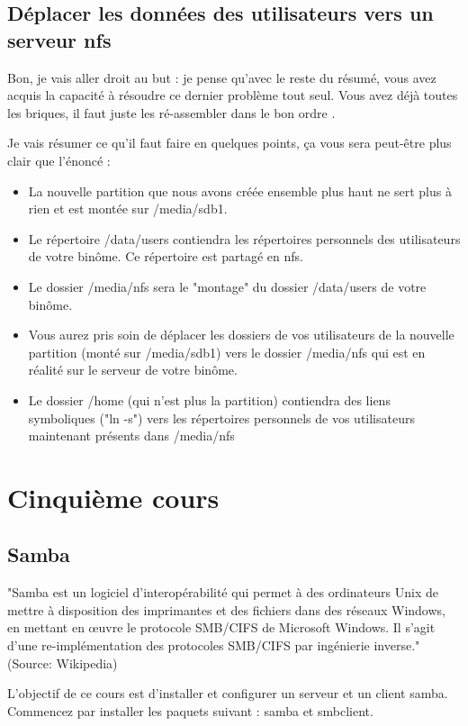 \documentclass[a4paper,11pt]{article}
\begin{document}
\subsection{Déplacer les données des utilisateurs vers un serveur nfs}
\par Bon, je vais aller droit au but : je pense qu'avec le reste du résumé, vous avez acquis la capacité à résoudre ce dernier problème tout seul. Vous avez déjà toutes les briques, il faut juste les ré-assembler dans le bon ordre%
.
\par Je vais résumer ce qu'il faut faire en quelques points, ça vous sera peut-être plus clair que l'énoncé :
\begin{itemize}
\item La nouvelle partition que nous avons créée ensemble plus haut ne sert plus à rien et est montée sur /media/sdb1.
\item Le répertoire /data/users contiendra les répertoires personnels des utilisateurs de votre binôme. Ce répertoire est partagé en nfs.
\item Le dossier /media/nfs sera le "montage" du dossier /data/users de votre binôme.
\item Vous aurez pris soin de déplacer les dossiers de vos utilisateurs de la nouvelle partition (monté sur /media/sdb1) vers le dossier /media/nfs qui est en réalité sur le serveur de votre binôme.
\item Le dossier /home (qui n'est plus la partition) contiendra des liens symboliques ("ln -s") vers les répertoires personnels de vos utilisateurs maintenant présents dans /media/nfs
\end{itemize}

\section{Cinquième cours}
\subsection{Samba}
\par "Samba est un logiciel d'interopérabilité qui permet à des ordinateurs Unix de mettre à disposition des imprimantes et des fichiers dans des réseaux Windows, en mettant en œuvre le protocole SMB/CIFS de Microsoft Windows. Il s'agit d'une re-implémentation des protocoles SMB/CIFS par ingénierie inverse." (Source: Wikipedia)
\par L'objectif de ce cours est d'installer et configurer un serveur et un client samba. Commencez par installer les paquets suivant : samba et smbclient.
\end{document}
